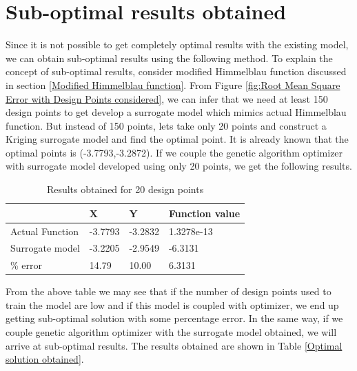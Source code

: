 \section{Sub-optimal results obtained}
Since it is not possible to get completely optimal results with the existing model, we can obtain sub-optimal results using the following method.
To explain the concept of sub-optimal results, consider modified Himmelblau function discussed in section \ref{Modified Himmelblau function}. From Figure \ref{fig:Root Mean Square Error with Design Points considered}, we can infer that we need at least 150 design points to get develop a surrogate model which mimics actual Himmelblau function. But instead of 150 points, lets take only 20 points and construct a Kriging surrogate model and find the optimal point. It is already known that the optimal points is  (-3.7793,-3.2872). If we couple the genetic algorithm optimizer with surrogate model developed using only 20 points, we get the following results.
\begin{table}[H]
	\centering
	\caption{Results obtained for 20 design points}
	\label{Results obtained for 20 design points}
	\begin{tabular}{llll}
		\hline \hline
		& X & Y & Function value \\ \hline
		Actual Function & -3.7793 &-3.2832 &1.3278e-13 \\
		Surrogate model & -3.2205 &-2.9549 & -6.3131 \\ \hline
		\% error & 14.79 & 10.00 & 6.3131 \\
		\hline \hline
	\end{tabular}
\end{table}
From the above table we may see that if the number of design points used to train the model are low and if this model is coupled with optimizer, we end up getting sub-optimal solution with some percentage error. In the same way, if we couple genetic algorithm optimizer with the surrogate model obtained, we will arrive at sub-optimal results. The results obtained are shown in Table \ref{Optimal solution obtained}.



